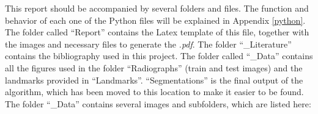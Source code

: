 \documentclass[a4paper,11pt,twoside]{article}
\begin{document}
This report should be accompanied by several folders and files. The function and behavior of each one of the Python files will be explained in Appendix \textsection\ref{python}. The folder called ``Report'' contains the Latex template of this file, together with the images and necessary files to generate the \textit{.pdf}. The folder ``\_Literature'' contains the bibliography used in this project. The folder called ``\_Data'' contains all the figures used in the folder ``Radiographs'' (train and test images) and the landmarks provided in ``Landmarks''. ``Segmentations'' is the final output of the algorithm, which has been moved to this location to make it easier to be found. The folder ``\_Data'' contains several images and subfolders, which are listed here:

\begin{itemize}


\end{itemize}
\end{document}

